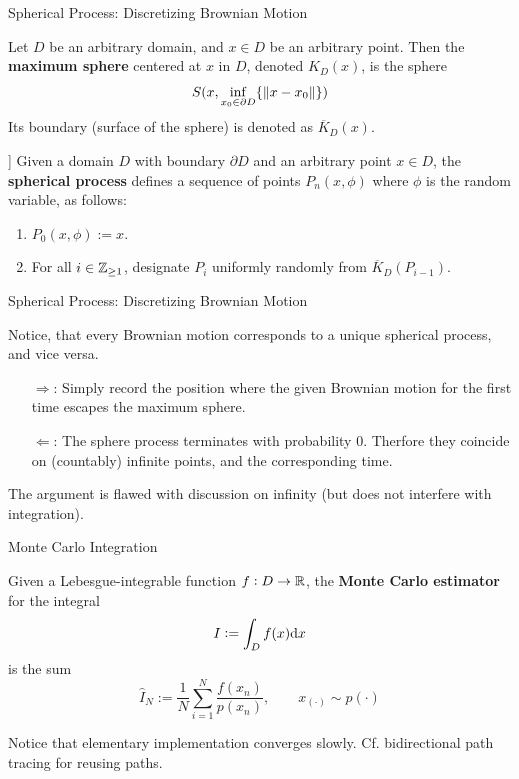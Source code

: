 \documentclass{beamer}
\begin{document}
\begin{frame}{Spherical Process: Discretizing Brownian Motion}

	\begin{definition}
		Let $D$ be an arbitrary domain, and $x \in D$ be an arbitrary point. Then the \textbf{maximum sphere} centered at $x$ in $D$, denoted ${K}_D(x)$, is the sphere
		\[
			S(x, \inf_{x_0 \in \partial D} \{ \left\|x - x_0\right\| \})
		\]
		Its boundary (surface of the sphere) is denoted as $\overline{{K}}_D(x)$.
	\end{definition}
	\horzline

	\begin{definition}[Spherical Process[Muller, 1956]]
		Given a domain $D$ with boundary $\partial D$ and an arbitrary point $x \in D$, the \textbf{spherical process} defines a sequence of points $P_n(x, \phi)$ where $\phi$ is the random variable, as follows:
		\begin{enumerate}
			\item $P_0(x, \phi) := x$.
			\item For all $i \in \mathbb{Z}_{\geq 1}$, designate $P_i$ uniformly randomly from $\overline{{K}}_D (P_{i-1})$. 
		\end{enumerate}
	\end{definition}
	\horzline

\end{frame}

\begin{frame}{Spherical Process: Discretizing Brownian Motion}
	
	Notice, that every Brownian motion corresponds to a unique spherical process, and vice versa.

	\begin{enumerate}
		\item[$\Rightarrow$:] Simply record the position where the given Brownian motion for the first time escapes the maximum sphere.
		\item[$\Leftarrow$:] The sphere process terminates with probability 0. Therfore they coincide on (countably) infinite points, and the corresponding time.
	\end{enumerate}

	The argument is flawed with discussion on infinity (but does not interfere with integration).

\end{frame}

\begin{frame}{Monte Carlo Integration}

	\begin{definition}
		Given a Lebesgue-integrable function $f: D \to \mathbb{R}$, the \textbf{Monte Carlo estimator} for the integral
		\[
			I := \int_D f(x) \mathrm{d} x
		\]
		is the sum
		\[
			\hat{I}_N := \frac{1}{N} \sum_{i = 1}^N \frac{f(x_n)}{p(x_n)}, \qquad x_{(\cdot)} \sim p(\cdot)
		\]
	\end{definition}
	\horzline

	Notice that elementary implementation converges slowly. Cf. bidirectional path tracing for reusing paths.
\end{frame}
\end{document}
